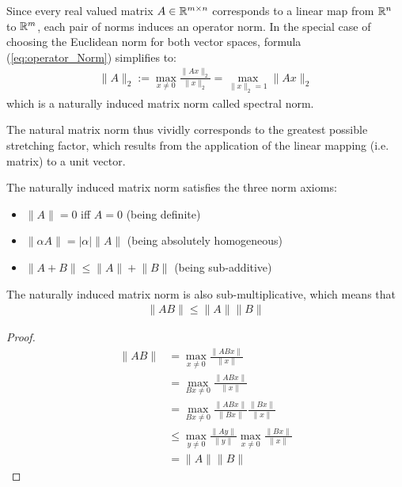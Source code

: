 \begin{remark}
	Since every real valued matrix $A \in \mathbb{R}^{m \times n}$ corresponds to a linear map from $\mathbb{R}^n$ to $\mathbb{R}^m$, each pair of norms induces an operator norm. In the special case of choosing the Euclidean norm for both vector spaces, formula (\ref{eq:operator_Norm}) simplifies to:
	\begin{align}\label{eq:matrix_Norm}
		\lVert A \rVert_2 := \max_{x \neq 0} \frac{\lVert Ax \rVert_2}{\lVert x \rVert_2} = \max_{\lVert x \rVert_{2} = 1} \lVert Ax \rVert_2
	\end{align}	
	which is a naturally induced matrix norm called spectral norm. 
\end{remark}

The natural matrix norm thus vividly corresponds to the greatest possible stretching factor, which results from the application of the linear mapping (i.e. matrix) to a unit vector.

\begin{remark}
	The naturally induced matrix norm satisfies the three norm axioms:
	\begin{itemize}
		\item $\lVert A \rVert = 0$ iff $A = 0$ \hfill (being definite)
		\item $\lVert \alpha A \rVert = |\alpha| \lVert A \rVert$ \hfill (being absolutely homogeneous)
		\item $\lVert A + B  \rVert \leq \lVert A \rVert + \lVert B \rVert$ \hfill (being sub-additive)
	\end{itemize}
\end{remark}

\begin{remark}
	The naturally induced matrix norm is also sub-multiplicative, which means that
	\begin{align*}
		\lVert AB \rVert \leq \lVert A \rVert \lVert B \rVert
	\end{align*}
	\begin{proof}
		\begin{align*}
		\lVert AB \lVert 	&= \max_{x \ne 0} \frac{\lVert ABx \lVert}{\lVert x \lVert} \\
							&=\max_{Bx \ne 0}\frac{\lVert ABx \lVert }{\lVert x\lVert } \\
							&=\max_{ Bx\ne 0}\frac{\lVert ABx\lVert}{\lVert Bx \lVert} \frac{\lVert Bx \lVert}{\lVert x \lVert} \\
							&\le \max_{y \ne 0} \frac{\lVert Ay \lVert}{\lVert y \lVert} \max_{x \ne 0} \frac{\lVert Bx \lVert}{\lVert x \lVert} \\
							&= \lVert A \lVert \lVert B \lVert
		\end{align*}
	\end{proof}
\end{remark}

